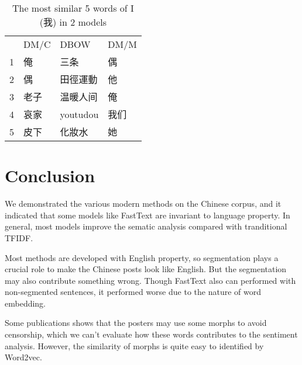 \begin{table}[]
\centering
\caption{The most similar 5 words of I (我) in 2 models}
\label{doc2vec}
\begin{tabular}{llll}
      & DM/C & DBOW & DM/M \\
1 & 俺 &  三条  & 偶\\
2 & 偶  & 田徑運動 & 他\\
3 & 老子  & 温暖人间 & 俺\\
4 & 哀家  & youtudou & 我们\\
5 & 皮下  & 化妝水 & 她
\end{tabular}
\end{table}

\section{Conclusion}

We demonstrated the various modern methods on the Chinese corpus, and it indicated that some models like FastText are invariant to language property. 
In general, most models improve the sematic analysis compared with tranditional TFIDF.

Most methods are developed with English property, so segmentation plays a crucial role to make the Chinese posts look like English.
 But the segmentation may also contribute something wrong. Though FastText also can performed with non-segmented sentences, it performed worse due to  the nature of word embedding.

Some publications\cite{Chen:2013:TUP:2512938.25} shows that the posters may use some morphs to avoid censorship, which we can't evaluate how these words contributes to the sentiment analysis. 
 However, the similarity of morphs is quite easy to identified by Word2vec. 